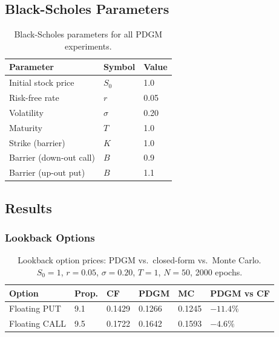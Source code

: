 \documentclass[12pt,a4paper]{article}
\begin{document}
\subsection{Black-Scholes Parameters}

\begin{table}[H]
\centering
\caption{Black-Scholes parameters for all PDGM experiments.}
\label{tab:pdgm_params}
\begin{tabular}{L{5cm} C{2.5cm} C{2.5cm}}
\toprule
\textbf{Parameter} & \textbf{Symbol} & \textbf{Value} \\
\midrule
Initial stock price   & $S_0$    & 1.0 \\
Risk-free rate        & $r$      & 0.05 \\
Volatility            & $\sigma$ & 0.20 \\
Maturity              & $T$      & 1.0 \\
Strike (barrier)      & $K$      & 1.0 \\
Barrier (down-out call) & $B$    & 0.9 \\
Barrier (up-out put)    & $B$    & 1.1 \\
\bottomrule
\end{tabular}
\end{table}

\subsection{Results}

\subsubsection{Lookback Options}

\begin{table}[H]
\centering
\caption{Lookback option prices: PDGM vs.\ closed-form vs.\ Monte Carlo.
  $S_0=1$, $r=0.05$, $\sigma=0.20$, $T=1$, $N=50$, 2000 epochs.}
\label{tab:pdgm_lookback}
\begin{tabular}{L{3.5cm} C{1.8cm} C{1.8cm} C{1.8cm} C{2.2cm} C{2.2cm}}
\toprule
\textbf{Option} & \textbf{Prop.} & \textbf{CF} & \textbf{PDGM} & \textbf{MC} & \textbf{PDGM vs CF} \\
\midrule
Floating PUT  & 9.1 & 0.1429 & 0.1266 & 0.1245 & $-11.4\%$ \\
Floating CALL & 9.5 & 0.1722 & 0.1642 & 0.1593 & $-4.6\%$ \\
\bottomrule
\end{tabular}
\end{table}
\end{document}
